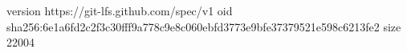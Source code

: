 version https://git-lfs.github.com/spec/v1
oid sha256:6e1a6fd2c2f3c30fff9a778c9e8c060ebfd3773e9bfe37379521e598c6213fe2
size 22004
